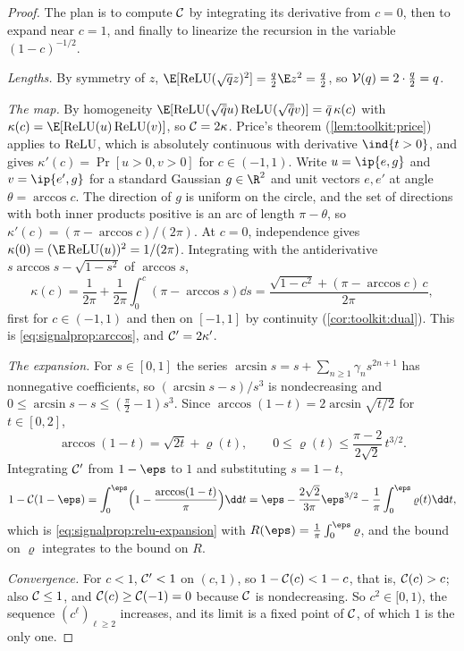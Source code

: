\begin{refsection}
\begin{proof}
The plan is to compute $\mathcal{C}$ by integrating its derivative from $c=0$, then to expand near $c=1$, and finally to linearize the recursion in the variable $(1-c)^{-1/2}$.

\emph{Lengths.} By symmetry of $z$, $\E[\relu(\sqrt qz)^2]=\frac q2\E z^2=\frac q2$, so $\mathcal{V}(q)=2\cdot\frac q2=q$.

\emph{The map.} By homogeneity $\E[\relu(\sqrt{\bar q}u)\relu(\sqrt{\bar q}v)]=\bar q\,\kappa(c)$ with $\kappa(c)=\E[\relu(u)\relu(v)]$, so $\mathcal{C}=2\kappa$. Price's theorem (\cref{lem:toolkit:price}) applies to $\operatorname{ReLU}$, which is absolutely continuous with derivative $\ind\{t>0\}$, and gives $\kappa'(c)=\Pr[u>0,v>0]$ for $c\in(-1,1)$. Write $u=\ip{e,g}$ and $v=\ip{e',g}$ for a standard Gaussian $g\in\R^2$ and unit vectors $e,e'$ at angle $\theta=\arccos c$. The direction of $g$ is uniform on the circle, and the set of directions with both inner products positive is an arc of length $\pi-\theta$, so $\kappa'(c)=(\pi-\arccos c)/(2\pi)$. At $c=0$, independence gives $\kappa(0)=(\E\relu(u))^2=1/(2\pi)$. Integrating with the antiderivative $s\arccos s-\sqrt{1-s^2}$ of $\arccos s$,
\[
  \kappa(c)=\frac1{2\pi}+\frac1{2\pi}\int_0^c(\pi-\arccos s)\dd s=\frac{\sqrt{1-c^2}+(\pi-\arccos c)\,c}{2\pi},
\]
first for $c\in(-1,1)$ and then on $[-1,1]$ by continuity (\cref{cor:toolkit:dual}). This is \eqref{eq:signalprop:arccos}, and $\mathcal{C}'=2\kappa'$.

\emph{The expansion.} For $s\in[0,1]$ the series $\arcsin s=s+\sum_{n\ge1}\gamma_ns^{2n+1}$ has nonnegative coefficients, so $(\arcsin s-s)/s^3$ is nondecreasing and $0\le\arcsin s-s\le(\frac\pi2-1)s^3$. Since $\arccos(1-t)=2\arcsin\sqrt{t/2}$ for $t\in[0,2]$,
\[
  \arccos(1-t)=\sqrt{2t}+\varrho(t),\qquad 0\le\varrho(t)\le\frac{\pi-2}{2\sqrt2}\,t^{3/2}.
\]
Integrating $\mathcal{C}'$ from $1-\eps$ to $1$ and substituting $s=1-t$,
\[
  1-\signalpropC(1-\eps)=\int_0^\eps\Bigl(1-\frac{\arccos(1-t)}\pi\Bigr)\dd t=\eps-\frac{2\sqrt2}{3\pi}\eps^{3/2}-\frac1\pi\int_0^\eps\varrho(t)\dd t ,
\]
which is \eqref{eq:signalprop:relu-expansion} with $R(\eps)=\frac1\pi\int_0^\eps\varrho$, and the bound on $\varrho$ integrates to the bound on $R$.

\emph{Convergence.} For $c<1$, $\mathcal{C}'<1$ on $(c,1)$, so $1-\mathcal{C}(c)<1-c$, that is, $\mathcal{C}(c)>c$; also $\mathcal{C}\le1$, and $\mathcal{C}(c)\ge\mathcal{C}(-1)=0$ because $\mathcal{C}$ is nondecreasing. So $c^2\in[0,1)$, the sequence $(c^\ell)_{\ell\ge2}$ increases, and its limit is a fixed point of $\mathcal{C}$, of which $1$ is the only one.


\end{proof}
\end{refsection}
